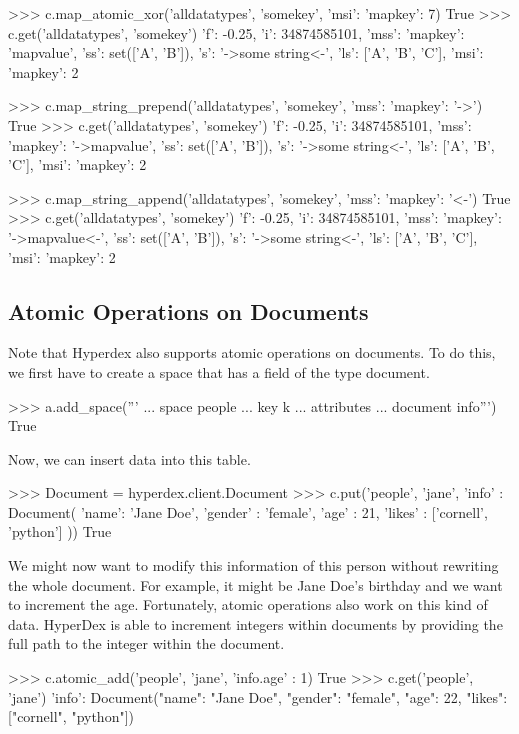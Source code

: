 \begin{pythoncode}
>>> c.map_atomic_xor('alldatatypes', 'somekey', {'msi': {'mapkey': 7}})
True
>>> c.get('alldatatypes', 'somekey')
{'f': -0.25, 'i': 34874585101, 'mss': {'mapkey': 'mapvalue'}, 'ss': set(['A', 'B']), 's': '->some string<-', 'ls': ['A', 'B', 'C'], 'msi': {'mapkey': 2}}

>>> c.map_string_prepend('alldatatypes', 'somekey', {'mss': {'mapkey': '->'}})
True
>>> c.get('alldatatypes', 'somekey')
{'f': -0.25, 'i': 34874585101, 'mss': {'mapkey': '->mapvalue'}, 'ss': set(['A', 'B']), 's': '->some string<-', 'ls': ['A', 'B', 'C'], 'msi': {'mapkey': 2}}

>>> c.map_string_append('alldatatypes', 'somekey', {'mss': {'mapkey': '<-'}})
True
>>> c.get('alldatatypes', 'somekey')
{'f': -0.25, 'i': 34874585101, 'mss': {'mapkey': '->mapvalue<-'}, 'ss': set(['A', 'B']), 's': '->some string<-', 'ls': ['A', 'B', 'C'], 'msi': {'mapkey': 2}}
\end{pythoncode}

\subsection{Atomic Operations on Documents}
Note that Hyperdex also supports atomic operations on documents. To do this, we
first have to create a space that has a field of the type document.

\begin{pythoncode}
>>> a.add_space('''
... space people
... key k
... attributes
...    document info''')
True
\end{pythoncode}

Now, we can insert data into this table.

\begin{pythoncode}
>>> Document = hyperdex.client.Document
>>> c.put('people', 'jane', {'info' : Document( {'name': 'Jane Doe', 'gender' : 'female', 'age' : 21, 'likes' : ['cornell', 'python']} )})
True
\end{pythoncode}

We might now want to modify this information of this person without rewriting
the whole document. For example, it might be Jane Doe's birthday and we want to
increment the age.  Fortunately, atomic operations also work on this kind of
data.  HyperDex is able to increment integers within documents by providing the
full path to the integer within the document.

\begin{pythoncode}
>>> c.atomic_add('people', 'jane', {'info.age' : 1})
True
>>> c.get('people', 'jane')
{'info': Document({"name": "Jane Doe", "gender": "female", "age": 22, "likes": ["cornell", "python"]})}
\end{pythoncode}


